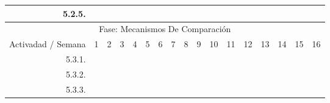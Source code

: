 \documentclass[12pt]{article}
\begin{document}
\begin{table}[H]
{\begin{tabular}{|rllllllllllllllll|}
        \multicolumn{1}{|r|}{5.2.5.} & \multicolumn{1}{l|}{} & \multicolumn{1}{l|}{} & \multicolumn{1}{l|}{} & \multicolumn{1}{l|}{} & \multicolumn{1}{l|}{} & \multicolumn{1}{l|}{} & \multicolumn{1}{c|}{\cellcolor[HTML]{A4C2F4}} & \multicolumn{1}{l|}{} & \multicolumn{1}{l|}{} & \multicolumn{1}{l|}{} & \multicolumn{1}{l|}{} & \multicolumn{1}{l|}{} & \multicolumn{1}{l|}{} & \multicolumn{1}{l|}{} & \multicolumn{1}{l|}{} &  \\ \hline
        \multicolumn{17}{|c|}{\cellcolor[HTML]{D9D9D9}Fase: Mecanismos De Comparación} \\ \hline
        \multicolumn{1}{|l|}{\cellcolor[HTML]{D9D9D9}Activadad / Semana} & \multicolumn{1}{c|}{\cellcolor[HTML]{B6D7A8}1} & \multicolumn{1}{c|}{\cellcolor[HTML]{B6D7A8}2} & \multicolumn{1}{c|}{\cellcolor[HTML]{B6D7A8}3} & \multicolumn{1}{c|}{\cellcolor[HTML]{B6D7A8}4} & \multicolumn{1}{c|}{\cellcolor[HTML]{A4C2F4}5} & \multicolumn{1}{c|}{\cellcolor[HTML]{A4C2F4}6} & \multicolumn{1}{c|}{\cellcolor[HTML]{A4C2F4}7} & \multicolumn{1}{c|}{\cellcolor[HTML]{A4C2F4}8} & \multicolumn{1}{c|}{\cellcolor[HTML]{B4A7D6}9} & \multicolumn{1}{c|}{\cellcolor[HTML]{B4A7D6}10} & \multicolumn{1}{c|}{\cellcolor[HTML]{B4A7D6}11} & \multicolumn{1}{c|}{\cellcolor[HTML]{B4A7D6}12} & \multicolumn{1}{c|}{\cellcolor[HTML]{EA9999}13} & \multicolumn{1}{c|}{\cellcolor[HTML]{EA9999}14} & \multicolumn{1}{c|}{\cellcolor[HTML]{EA9999}15} & \multicolumn{1}{c|}{\cellcolor[HTML]{EA9999}16} \\ \hline
        \multicolumn{1}{|r|}{5.3.1.} & \multicolumn{1}{l|}{} & \multicolumn{1}{l|}{} & \multicolumn{1}{l|}{} & \multicolumn{1}{l|}{} & \multicolumn{1}{l|}{} & \multicolumn{1}{l|}{} & \multicolumn{1}{c|}{\cellcolor[HTML]{A4C2F4}} & \multicolumn{1}{l|}{} & \multicolumn{1}{l|}{} & \multicolumn{1}{l|}{} & \multicolumn{1}{l|}{} & \multicolumn{1}{l|}{} & \multicolumn{1}{l|}{} & \multicolumn{1}{l|}{} & \multicolumn{1}{l|}{} &  \\ \hline
        \multicolumn{1}{|r|}{5.3.2.} & \multicolumn{1}{l|}{} & \multicolumn{1}{l|}{} & \multicolumn{1}{l|}{} & \multicolumn{1}{l|}{} & \multicolumn{1}{l|}{} & \multicolumn{1}{l|}{} & \multicolumn{1}{c|}{\cellcolor[HTML]{A4C2F4}} & \multicolumn{1}{c|}{\cellcolor[HTML]{A4C2F4}} & \multicolumn{1}{c|}{\cellcolor[HTML]{B4A7D6}} & \multicolumn{1}{l|}{} & \multicolumn{1}{l|}{} & \multicolumn{1}{l|}{} & \multicolumn{1}{l|}{} & \multicolumn{1}{l|}{} & \multicolumn{1}{l|}{} &  \\ \hline
        \multicolumn{1}{|r|}{5.3.3.} & \multicolumn{1}{l|}{} & \multicolumn{1}{l|}{} & \multicolumn{1}{l|}{} & \multicolumn{1}{l|}{} & \multicolumn{1}{l|}{} & \multicolumn{1}{l|}{} & \multicolumn{1}{l|}{} & \multicolumn{1}{c|}{\cellcolor[HTML]{A4C2F4}} & \multicolumn{1}{c|}{\cellcolor[HTML]{B4A7D6}} & \multicolumn{1}{c|}{\cellcolor[HTML]{B4A7D6}} & \multicolumn{1}{l|}{} & \multicolumn{1}{l|}{} & \multicolumn{1}{l|}{} & \multicolumn{1}{l|}{} & \multicolumn{1}{l|}{} &  \\ \hline

\end{tabular}}
\end{table}
\end{document}
